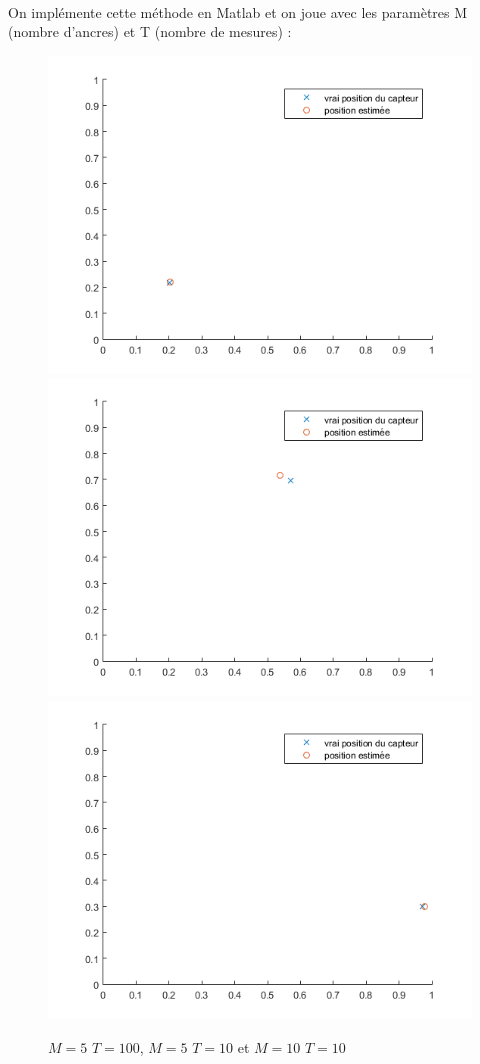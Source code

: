 \documentclass{article}
\begin{document}
\paragraph{} On impl\'emente cette m\'ethode en Matlab et on joue avec les param\`etres M (nombre d'ancres) et T (nombre de mesures) :
\begin{figure}[h]
\includegraphics[scale=0.4]{ancre_M5T100.png} \includegraphics[scale=0.4]{ancre_M5T10.png} \includegraphics[scale=0.4]{ancre_M10T10.png} 
\caption{$M=5$ $T=100$, $M=5$ $T=10$ et $M=10$ $T=10$}
\end{figure} 
\end{document}
